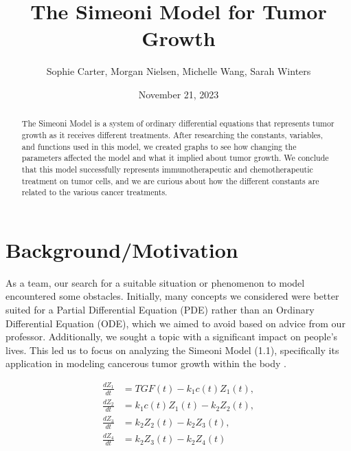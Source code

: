 \documentclass[11pt,reqno]{amsart}
\begin{document}
\title{The Simeoni Model for Tumor Growth}
\author{Sophie Carter, Morgan Nielsen, Michelle Wang, Sarah Winters}
\date{November 21, 2023}



\maketitle

\begin{abstract}
The Simeoni Model is a system of ordinary differential equations that represents tumor growth as it receives different treatments. After researching the constants, variables, and functions used in this model, we created graphs to see how changing the parameters affected the model and what it implied about tumor growth. We conclude that this model successfully represents immunotherapeutic and chemotherapeutic treatment on tumor cells, and we are curious about how the different constants are related to the various cancer treatments. 
\end{abstract}

\section{Background/Motivation}
As a team, our search for a suitable situation or phenomenon to model encountered some obstacles. Initially, many concepts we considered were better suited for a Partial Differential Equation (PDE) rather than an Ordinary Differential Equation (ODE), which we aimed to avoid based on advice from our professor. Additionally, we sought a topic with a significant impact on people's lives. This led us to focus on analyzing the Simeoni Model (1.1), specifically its application in modeling cancerous tumor growth within the body \cite{Koziol_Falls_Schnitzer_2020}.

\begin{equation}\label{eq:1.1}
\begin{aligned}
    \frac{dZ_1}{dt} &= TGF(t) - k_1c(t)Z_1(t), \\
    \frac{dZ_2}{dt} &= k_1c(t)Z_1(t) - k_2Z_2(t), \\ 
    \frac{dZ_3}{dt} &= k_2Z_2(t) - k_2Z_3(t), \\
    \frac{dZ_4}{dt} &= k_2Z_3(t) - k_2Z_4(t)
\end{aligned}
\tag*{(1.1)}
\end{equation}
\hspace{2em}
\end{document}
